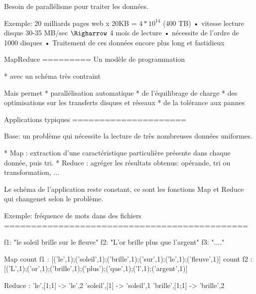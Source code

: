 

Besoin de parallélisme pour traiter les données.


Exemple: 20 milliards pages web x 20KB = $4* 10^{14}$ (400 TB)
• vitesse lecture disque 30-35 MB/sec
$\Righarrow$ 4 mois de lecture
• nécessite de l'ordre de 1000 disques
• Traitement de ces données encore plus long et fastidieux


MapReduce
=========
Un modèle de programmation

* avec un schéma très contraint

Mais permet
* parallélisation automatique
* de l'équilibrage de charge
* des optimisations sur les transferts disques et réseaux
* de la tolérance aux pannes


Applications typiques
=====================


Base: un problème qui nécessite la lecture de très 
nombreuses données uniformes.

* Map : extraction d'une caractéristique particulière présente dans chaque donnée,
puis tri.
* Reduce : agréger les résultats obtenus: opérande, tri ou transformation, ...

Le schéma de l'application reste constant, ce sont les 
fonctions Map et Reduce qui changenet selon le problème.


Exemple: fréquence de mots dans des fichiers
=============================================

f1: "le soleil brille sur le fleuve"
f2: "L'or brille plus que l'argent"
f3: "...."

Map count f1 : [('le',1);('soleil',1);('brille',1);('sur',1);('le',1);('fleuve',1)]
    count f2 : [('L',1);('or',1);('brille',1);('plus');('que',1);('l',1);('argent',1)]

Reduce :
     'le',[1;1]     ->  'le',2
     'soleil',[1]   ->  'soleil',1
     'brille',[1;1]   ->  'brille',2










